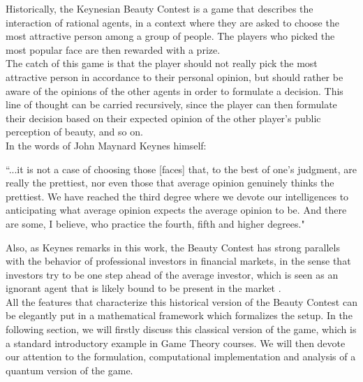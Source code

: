 Historically, the Keynesian Beauty Contest is a game that describes the interaction of rational agents, in a context where they are asked to choose the most attractive person among a group of people. The players who picked the most popular face are then rewarded with a prize.\\

The catch of this game is that the player should not really pick the most attractive person in accordance to their personal opinion, but should rather be aware of the opinions of the other agents in order to formulate a decision. This line of thought can be carried recursively, since the player can then formulate their decision based on their expected opinion of the other player's public perception of beauty, and so on.\\

In the words of John Maynard Keynes himself:
\begin{displayquote}
``...it is not a case of choosing those [faces] that, to the best of one's judgment, are really the prettiest, nor even those that average opinion genuinely thinks the prettiest. We have reached the third degree where we devote our intelligences to anticipating what average opinion expects the average opinion to be. And there are some, I believe, who practice the fourth, fifth and higher degrees." \citep{Keynes_1936}
\end{displayquote}
Also, as Keynes remarks in this work, the Beauty Contest has strong parallels with the behavior of professional investors in financial markets, in the sense that investors try to be one step ahead of the average investor, which is seen as an ignorant agent that is likely bound to be present in the market \citep{Duffy1997beauty}.\\

All the features that characterize this historical version of the Beauty Contest can be elegantly put in a mathematical framework which formalizes the setup. In the following section, we will firstly discuss this classical version of the game, which is a standard introductory example in Game Theory courses. We will then devote our attention to the formulation, computational implementation and analysis of a quantum version of the game.\\
